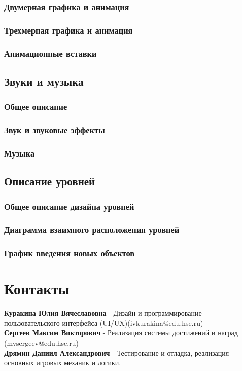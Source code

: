 \documentclass{article}
\begin{document}
\subsubsection{Двумерная графика и анимация}

\subsubsection{Трехмерная графика и анимация}

\subsubsection{Анимационные вставки}

\subsection{Звуки и музыка}

\subsubsection{Общее описание}

\subsubsection{Звук и звуковые эффекты}

\subsubsection{Музыка}

\subsection{Описание уровней}

\subsubsection{Общее описание дизайна уровней}

\subsubsection{Диаграмма взаимного расположения уровней}

\subsubsection{График введения новых объектов}

\newpage
\section{Контакты}

\textbf{Куракина Юлия Вячеславовна} - Дизайн и программирование пользовательского интерфейса (UI/UX)(ivkurakina@edu.hse.ru)\\
\textbf{Сергеев Максим Викторович} - Реализация системы достижений и наград (mvsergeev@edu.hse.ru)\\
\textbf{Дрямин Даниил Александрович} - Тестирование и отладка, реализация основных игровых механик и логики.\\
\end{document}
